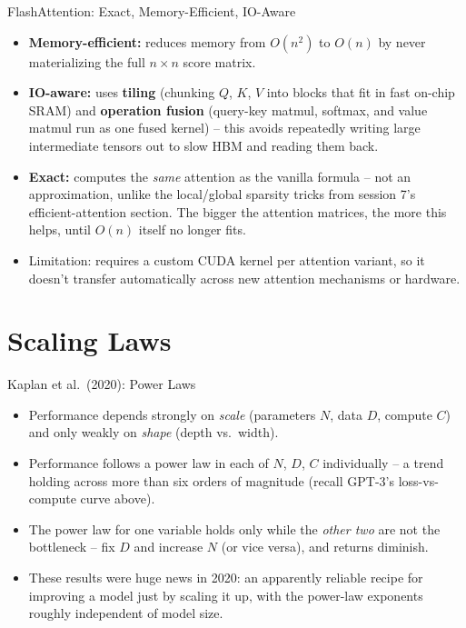 \begin{vbframe}{FlashAttention: Exact, Memory-Efficient, IO-Aware}
\begin{itemize}
  \item \textbf{Memory-efficient:} reduces memory from $O(n^2)$ to $O(n)$ by never materializing the full $n\times n$ score matrix.
  \item \textbf{IO-aware:} uses \textbf{tiling} (chunking $Q$, $K$, $V$ into blocks that fit in fast on-chip SRAM) and \textbf{operation fusion} (query-key matmul, softmax, and value matmul run as one fused kernel) -- this avoids repeatedly writing large intermediate tensors out to slow HBM and reading them back.
  \item \textbf{Exact:} computes the \textit{same} attention as the vanilla formula -- not an approximation, unlike the local/global sparsity tricks from session 7's efficient-attention section. The bigger the attention matrices, the more this helps, until $O(n)$ itself no longer fits.
  \item Limitation: requires a custom CUDA kernel per attention variant, so it doesn't transfer automatically across new attention mechanisms or hardware.
\end{itemize}
\end{vbframe}


\section{Scaling Laws}

\begin{vbframe}{Kaplan et al.\ (2020): Power Laws}
\href{https://arxiv.org/abs/2001.08361}{}
\begin{itemize}
  \item Performance depends strongly on \textit{scale} (parameters $N$, data $D$, compute $C$) and only weakly on \textit{shape} (depth vs.\ width).
  \item Performance follows a power law in each of $N$, $D$, $C$ individually -- a trend holding across more than six orders of magnitude (recall GPT-3's loss-vs-compute curve above).
  \item The power law for one variable holds only while the \textit{other two} are not the bottleneck -- fix $D$ and increase $N$ (or vice versa), and returns diminish.
  \item These results were huge news in 2020: an apparently reliable recipe for improving a model just by scaling it up, with the power-law exponents roughly independent of model size.
\end{itemize}
\end{vbframe}

